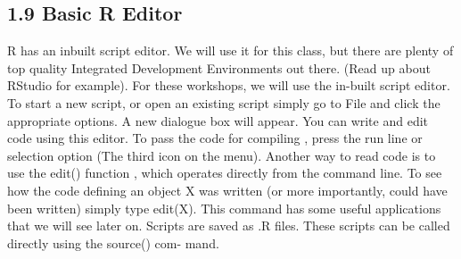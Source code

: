 
\subsection{1.9 Basic R Editor}
R has an inbuilt script editor. We will use it for this class, but there are plenty of top quality
Integrated Development Environments out there. (Read up about RStudio for example).
For these workshops, we will use the in-built script editor.
To start a new script, or open an existing script simply go to File and click the appropriate
options. A new dialogue box will appear. You can write and edit code using this editor.
To pass the code for compiling , press the run line or selection option (The third icon
on the menu).
Another way to read code is to use the edit() function , which operates directly from the
command line. To see how the code defining an object X was written (or more importantly,
could have been written) simply type edit(X). This command has some useful applications
that we will see later on.
Scripts are saved as .R files. These scripts can be called directly using the source() com-
mand.

